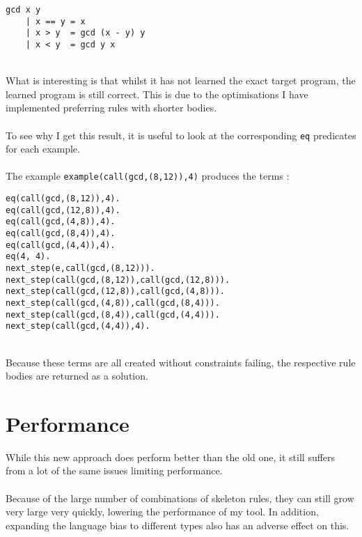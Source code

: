 \begin{lstlisting}
gcd x y
	| x == y = x
	| x > y	 = gcd (x - y) y
	| x < y	 = gcd y x
\end{lstlisting}
\mbox{} \\
What is interesting is that whilst it has not learned the exact target program, the learned program is still correct. This is due to the optimisations I have implemented preferring rules with shorter bodies.\\ \\
To see why I get this result, it is useful to look at the corresponding \lstinline{eq} predicates for each example. \\ \\%
The example \lstinline{example(call(gcd,(8,12)),4)} produces the terms :\\ %
\begin{multicols}{2}
\begin{lstlisting}
eq(call(gcd,(8,12)),4). 
eq(call(gcd,(12,8)),4).
eq(call(gcd,(4,8)),4).
eq(call(gcd,(8,4)),4).
eq(call(gcd,(4,4)),4).
eq(4, 4).
next_step(e,call(gcd,(8,12))).
next_step(call(gcd,(8,12)),call(gcd,(12,8))).
next_step(call(gcd,(12,8)),call(gcd,(4,8))).
next_step(call(gcd,(4,8)),call(gcd,(8,4))).
next_step(call(gcd,(8,4)),call(gcd,(4,4))).
next_step(call(gcd,(4,4)),4).
\end{lstlisting}
\end{multicols}
\mbox{}\\
Because these terms are all created without constraints failing, the respective rule bodies are returned as a solution.

\section{Performance}
While this new approach does perform better than the old one, it still suffers from a lot of the same issues limiting performance. \\ \\
Because of the large number of combinations of skeleton rules, they can still grow very large very quickly, lowering the performance of my tool. In addition, expanding the language bias to different types also has an adverse effect on this.


